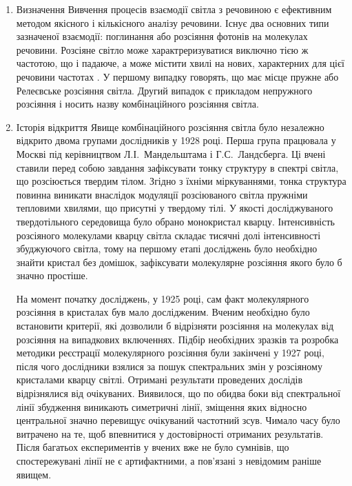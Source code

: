 \documentclass[a4paper]{article}
\begin{document}
            \begin{enumerate}
                \item{Визначення}
                    Вивчення процесів взаємодії світла з речовиною є ефективним методом якісного і кількісного аналізу речовини. Існує два основних
                    типи зазначеної взаємодії: поглинання або розсіяння фотонів на молекулах речовини. Розсіяне світло може характреризуватися
                    виключно тією ж частотою, що і падаюче, а може містити хвилі на нових, характерних для цієї речовини частотах . У першому випадку
                    говорять, що має місце пружне або Релеєвське розсіяння світла. Другий випадок є прикладом непружного розсіяння і носить назву
                    комбінаційного розсіяння світла. 
                \item{Історія відкриття}
                    Явище комбінаційного розсіяння світла було незалежно відкрито двома групами дослідників у 1928 році. Перша група працювала у
                    Москві під керівництвом \mbox{Л.І. Мандельштама} і \mbox{Г.С. Ландсберга}. Ці вчені ставили перед собою завдання зафіксувати тонку
                    структуру в спектрі світла, що розсіюється твердим тілом. Згідно з їхніми міркуваннями, тонка структура повинна виникати внаслідок
                    модуляції розсіюваного світла пружніми тепловими хвилями, що присутні у твердому тілі. У якості досліджуваного твердотільного
                    середовища було обрано монокристал кварцу. Інтенсивність розсіяного молекулами кварцу світла складає тисячні долі інтенсивності
                    збуджуючого світла, тому на першому етапі досліджень було необхідно знайти кристал без домішок, зафіксувати молекулярне розсіяння
                    якого було б значно простіше.
                    
                    На момент початку досліджень, у 1925 році, сам факт молекулярного розсіяння в кристалах був мало дослідженим. Вченим необхідно
                    було встановити критерії, які дозволили б відрізняти розсіяння на молекулах від розсіяння на випадкових включеннях. Підбір
                    необхідних зразків та розробка методики реєстрації молекулярного розсіяння були закінчені у 1927 році, після чого дослідники
                    взялися за пошук спектральних змін у розсіяному кристалами кварцу світлі. Отримані результати проведених дослідів відрізнялися від
                    очікуваних. Виявилося, що по обидва боки від спектральної лінії збудження виникають симетричні лінії, зміщення яких відносно
                    центральної значно перевищує очікуваний частотний зсув. Чимало часу було витрачено на те, щоб впевнитися у достовірності отриманих
                    результатів. Після багатьох експериментів у вчених вже не було сумнівів, що спостережувані лінії не є артифактними, а
                    пов'язані з невідомим раніше явищем.


\end{enumerate}
\end{document}
